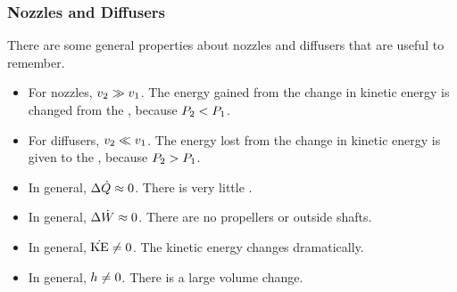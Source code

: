 \subsubsection{Nozzles and Diffusers}\label{subsubsec:Nozzles_Diffusers}
There are some general properties about nozzles and diffusers that are useful to remember.
\begin{itemize}[noitemsep]
\item For nozzles, $v_{2} \gg v_{1}$.
  The energy gained from the change in kinetic energy is changed from the , because $P_{2} < P_{1}$.
\item For diffusers, $v_{2} \ll v_{1}$.
  The energy lost from the change in kinetic energy is given to the , because $P_{2} > P_{1}$.
\item In general, $\Delta \dot{Q} \approx 0$.
  There is very little .
\item In general, $\Delta \dot{W} \approx 0$.
  There are no propellers or outside shafts.
\item In general, $\dot{\mathrm{KE}} \neq 0$.
  The kinetic energy changes dramatically.
\item In general, $h \neq 0$.
  There is a large volume change.
\end{itemize}

